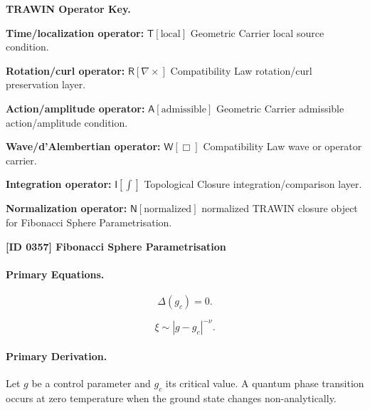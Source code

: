 \par\vspace{0.45\baselineskip}
\noindent\begin{minipage}[t]{\linewidth}
\begingroup
\small
\raggedright
\textbf{TRAWIN Operator Key.}\par
\noindent\textbf{Time/localization operator:} $\mathsf{T}\!\left[\mathrm{local}\right]$ Geometric Carrier local source condition.\par
\noindent\textbf{Rotation/curl operator:} $\mathsf{R}\!\left[\nabla\times\right]$ Compatibility Law rotation/curl preservation layer.\par
\noindent\textbf{Action/amplitude operator:} $\mathsf{A}\!\left[\mathrm{admissible}\right]$ Geometric Carrier admissible action/amplitude condition.\par
\noindent\textbf{Wave/d'Alembertian operator:} $\mathsf{W}\!\left[\Box\right]$ Compatibility Law wave or operator carrier.\par
\noindent\textbf{Integration operator:} $\mathsf{I}\!\left[\int\right]$ Topological Closure integration/comparison layer.\par
\noindent\textbf{Normalization operator:} $\mathsf{N}\!\left[\mathrm{normalized}\right]$ normalized TRAWIN closure object for Fibonacci Sphere Parametrisation.\par
\endgroup
\end{minipage}

\clearpage
\noindent\textbf{[ID 0357] Fibonacci Sphere Parametrisation}\par
\vspace{0.35em}
\paragraph{Primary Equations.}
\begin{equation}
\Delta(g_c)=0 .
\end{equation}

\begin{equation}
\xi \sim |g-g_c|^{-\nu}.
\end{equation}

\paragraph{Primary Derivation.}
Let $g$ be a control parameter and $g_c$ its critical value.  
A quantum phase transition occurs at zero temperature when the ground state changes non-analytically.

